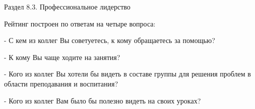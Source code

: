 \begin{frame}{Раздел 8.3. Профессиональное лидерство}


\tiny
Рейтинг построен по ответам на четыре вопроса:
\smallskip

- С кем из коллег Вы советуетесь, к кому обращаетесь за помощью?
\smallskip

- К кому Вы чаще ходите на занятия?
\smallskip

- Кого из коллег Вы хотели бы видеть в составе группы для решения проблем в области преподавания и воспитания?
\smallskip

- Кого из коллег Вам было бы полезно видеть на своих уроках?
\smallskip

\end{frame}


